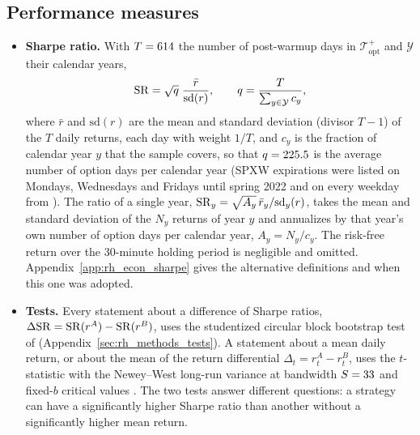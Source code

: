 \subsection{Performance measures}
\label{sec:rh_econ_measures}
\begin{itemize}
\item \textbf{Sharpe ratio.} With $T = 614$ the number of post-warmup days in $\mathcal T_{\mathrm{opt}}^{+}$
  and $\mathcal Y$ their \rheNYears{} calendar years,
  \[
    \mathrm{SR} = \sqrt{q}\;\frac{\bar r}{\mathrm{sd}(r)},
    \qquad
    q = \frac{T}{\sum_{y \in \mathcal Y} c_y},
  \]
  where $\bar r$ and $\mathrm{sd}(r)$ are the mean and standard deviation (divisor $T - 1$) of the $T$ daily returns,
  each day with weight $1/T$, and $c_y$ is the fraction of calendar year $y$ that the sample covers, so that
  $q = 225.5$ is the average number of option days per calendar year (SPXW expirations were listed on Mondays,
  Wednesdays and Fridays until spring 2022 and on every weekday from \rheSplitDate). The ratio of a single year,
  $\mathrm{SR}_y = \sqrt{A_y}\,\bar r_y/\mathrm{sd}_y(r)$, takes the mean and standard deviation of the $N_y$ returns of year
  $y$ and annualizes by that year's own number of option days per calendar year, $A_y = N_y/c_y$. The risk-free
  return over the 30-minute holding period is negligible and omitted. Appendix~\ref{app:rh_econ_sharpe} gives the
  alternative definitions and when this one was adopted.
\item \textbf{Tests.} Every statement about a difference of Sharpe ratios, $\Delta\mathrm{SR} = \mathrm{SR}(r^A) - \mathrm{SR}(r^B)$, uses
  the studentized circular block bootstrap test of \citet{LedoitWolf2008} (Appendix~\ref{sec:rh_methods_tests}).
  A statement about
  a mean daily return, or about the mean of the return differential $\Delta_t = r^A_t - r^B_t$, uses the
  $t$-statistic with the Newey--West long-run variance at bandwidth $S = 33$ and fixed-$b$ critical values
  \citep{KieferVogelsang2005,LazarusLewisStockWatson2018}. The two tests answer different questions: a strategy can
  have a significantly higher Sharpe ratio than another without a significantly higher mean return.
\end{itemize}

